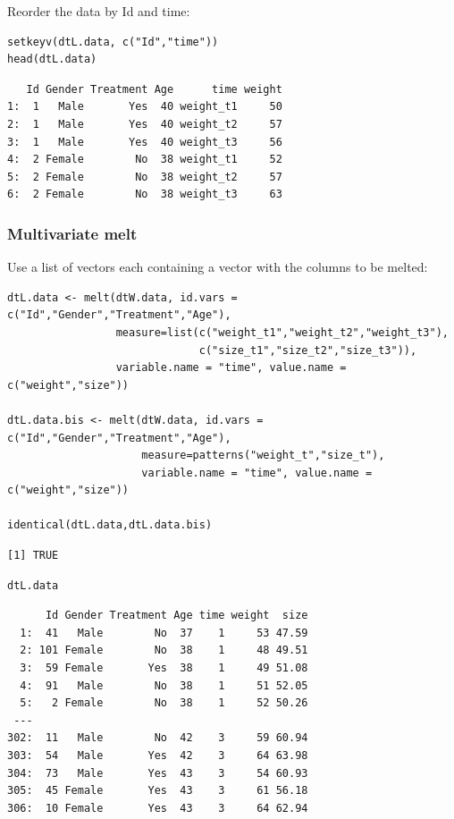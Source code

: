 \documentclass{article}
\begin{document}
Reorder the data by Id and time:
\lstset{language=r,label= ,caption= ,captionpos=b,numbers=none}
\begin{lstlisting}
setkeyv(dtL.data, c("Id","time"))
head(dtL.data)
\end{lstlisting}

\begin{verbatim}
   Id Gender Treatment Age      time weight
1:  1   Male       Yes  40 weight_t1     50
2:  1   Male       Yes  40 weight_t2     57
3:  1   Male       Yes  40 weight_t3     56
4:  2 Female        No  38 weight_t1     52
5:  2 Female        No  38 weight_t2     57
6:  2 Female        No  38 weight_t3     63
\end{verbatim}


\clearpage

\subsubsection{Multivariate melt}
\label{sec:orgddd86f9}

Use a list of vectors each containing a vector with the columns to be
melted:
\lstset{language=r,label= ,caption= ,captionpos=b,numbers=none}
\begin{lstlisting}
dtL.data <- melt(dtW.data, id.vars = c("Id","Gender","Treatment","Age"), 
                 measure=list(c("weight_t1","weight_t2","weight_t3"), 
                              c("size_t1","size_t2","size_t3")),
                 variable.name = "time", value.name = c("weight","size"))

dtL.data.bis <- melt(dtW.data, id.vars = c("Id","Gender","Treatment","Age"), 
                     measure=patterns("weight_t","size_t"),
                     variable.name = "time", value.name = c("weight","size"))

identical(dtL.data,dtL.data.bis)
\end{lstlisting}

\begin{verbatim}
[1] TRUE
\end{verbatim}


\lstset{language=r,label= ,caption= ,captionpos=b,numbers=none}
\begin{lstlisting}
dtL.data
\end{lstlisting}

\begin{verbatim}
      Id Gender Treatment Age time weight  size
  1:  41   Male        No  37    1     53 47.59
  2: 101 Female        No  38    1     48 49.51
  3:  59 Female       Yes  38    1     49 51.08
  4:  91   Male        No  38    1     51 52.05
  5:   2 Female        No  38    1     52 50.26
 ---                                           
302:  11   Male        No  42    3     59 60.94
303:  54   Male       Yes  42    3     64 63.98
304:  73   Male       Yes  43    3     54 60.93
305:  45 Female       Yes  43    3     61 56.18
306:  10 Female       Yes  43    3     64 62.94
\end{verbatim}
\end{document}

